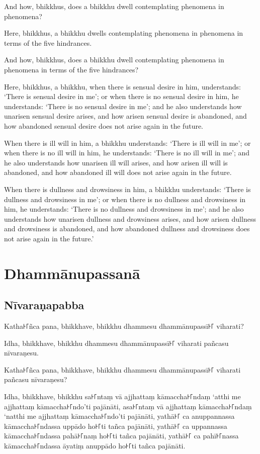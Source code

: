 And how, bhikkhus, does a bhikkhu dwell contemplating phenomena in phenomena?

Here, bhikkhus, a bhikkhu dwells contemplating phenomena in phenomena in terms
of the five hindrances.

And how, bhikkhus, does a bhikkhu dwell contemplating phenomena in phenomena in
terms of the five hindrances?

Here, bhikkhus, a bhikkhu,
when there is sensual desire in him, understands:
`There is sensual desire in me';
or when there is no sensual desire in him, he understands:
`There is no sensual desire in me';
and he also understands how unarisen sensual desire arises,
and how arisen sensual desire is abandoned,
and how abandoned sensual desire does not arise again in the future.

When there is ill will in him, a bhikkhu understands:
`There is ill will in me';
or when there is no ill will in him, he understands:
`There is no ill will in me';
and he also understands how unarisen ill will arises,
and how arisen ill will is abandoned,
and how abandoned ill will does not arise again in the future.

When there is dullness and drowsiness in him, a bhikkhu understands:
`There is dullness and drowsiness in me';
or when there is no dullness and drowsiness in him, he understands:
`There is no dullness and drowsiness in me';
and he also understands how unarisen dullness and drowsiness arises,
and how arisen dullness and drowsiness is abandoned, and
how abandoned dullness and drowsiness does not arise again in the future.'

\paliPage
\chapter*{Dhammānupassanā}

\section*{Nīvaraṇapabba}

Katha꜔꜒ñca pana, bhikkhave, bhikkhu dhammesu dhammānupassī꜔꜒ viharati?

Idha, bhikkhave, bhikkhu dhammesu dhammānupassī꜔꜒ viharati pañcasu nīvaraṇesu.

Katha꜔꜒ñca pana, bhikkhave, bhikkhu dhammesu dhammānupassī꜔꜒ viharati pañcasu
nīvaraṇesu?

Idha, bhikkhave, bhikkhu
sa꜔꜒ntaṃ vā ajjhattaṃ kāmaccha꜔꜒ndaṃ ‘atthi me ajjhattaṃ kāmaccha꜔꜒ndo’ti pajānāti,
asa꜔꜒ntaṃ vā ajjhattaṃ kāmaccha꜔꜒ndaṃ ‘natthi me ajjhattaṃ kāmaccha꜔꜒ndo’ti pajānāti,
yathā꜔꜒ ca anuppannassa kāmaccha꜔꜒ndassa uppādo ho꜔꜒ti tañca pajānāti,
yathā꜔꜒ ca uppannassa kāmaccha꜔꜒ndassa pahā꜔꜒naṃ ho꜔꜒ti tañca pajānāti,
yathā꜔꜒ ca pahī꜔꜒nassa kāmaccha꜔꜒ndassa āyatiṃ anuppādo ho꜔꜒ti tañca pajānāti.

